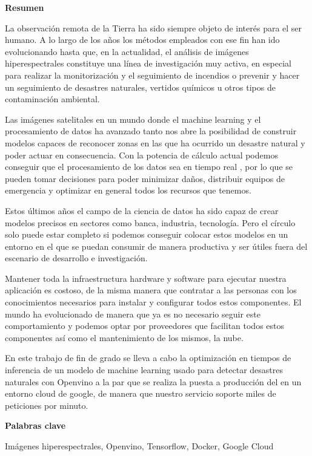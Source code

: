 \cleardoublepage
\begin{center}

{\bf \Huge Resumen}

\end{center}

La observación remota de la Tierra ha sido siempre objeto de interés para el ser humano.
A lo largo de los años los métodos empleados con ese fin han ido evolucionando hasta que, en la actualidad, el análisis de imágenes hiperespectrales constituye una línea de
investigación muy activa, en especial para realizar la monitorización y el seguimiento de incendios o prevenir y hacer un seguimiento de desastres naturales, vertidos químicos
u otros tipos de contaminación ambiental.

Las imágenes satelitales en un mundo donde el machine learning y el procesamiento de datos ha avanzado tanto nos abre la posibilidad de construir modelos capaces de reconocer zonas
en las que ha ocurrido un desastre natural y poder actuar en consecuencia.
Con la potencia de cálculo actual podemos conseguir que el procesamiento de los datos sea en tiempo real , por lo que se pueden tomar decisiones para poder minimizar daños, distribuir
equipos de emergencia y optimizar en general todos los recursos que tenemos.

Estos últimos años el campo de la ciencia de datos ha sido capaz de crear modelos precisos en sectores como banca, industria, tecnología.
Pero el círculo solo puede estar completo si podemos
conseguir colocar estos modelos en un entorno en el que se puedan consumir de manera productiva y ser útiles fuera del escenario de desarrollo e investigación.

Mantener toda la infraestructura hardware y software para ejecutar nuestra aplicación es costoso, de la misma manera que contratar a las personas con los conocimientos necesarios
para instalar y configurar todos estos componentes.
El mundo ha evolucionado de manera que ya es no necesario seguir este comportamiento y podemos optar por proveedores que facilitan todos estos componentes
así como el mantenimiento de los mismos, la nube.

En este trabajo de fin de grado se lleva a cabo la optimización en tiempos de inferencia de un modelo de machine learning usado para detectar desastres naturales con Openvino a la par que se realiza la puesta a
producción del en un entorno cloud de google, de manera que nuestro servicio soporte miles de peticiones por minuto.

\vspace{0.8cm}
\begin{center}


{\bf \Large Palabras clave}

\end{center}

Imágenes hiperespectrales, Openvino, Tensorflow, Docker, Google Cloud

\vspace{0.3cm}